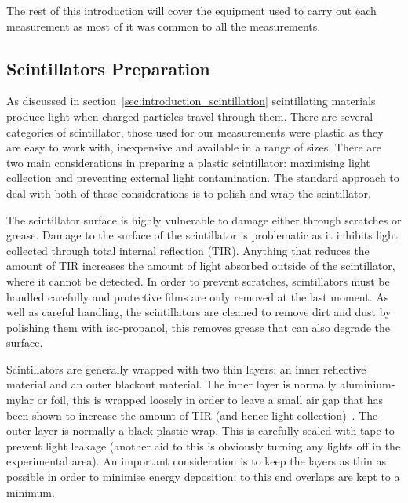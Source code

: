 The rest of this introduction will cover the equipment used to carry out each measurement as most of it was common to all the measurements.
\subsection{Scintillators Preparation} %
\label{sub:scintillator_preparation}
As discussed in section~\ref{sec:introduction_scintillation} scintillating materials produce light when charged particles travel through them. There are several categories of scintillator, those used for our measurements were plastic as they are easy to work with, inexpensive and available in a range of sizes. There are two main considerations in preparing a plastic scintillator: maximising light collection and preventing external light contamination. The standard approach to deal with both of these considerations is to polish and wrap the scintillator.

The scintillator surface is highly vulnerable to damage either through scratches or grease. Damage to the surface of the scintillator is problematic as it inhibits light collected through total internal reflection (TIR). Anything that reduces the amount of TIR increases the amount of light absorbed outside of the scintillator, where it cannot be detected. In order to prevent scratches, scintillators must be handled carefully and protective films are only removed at the last moment. As well as careful handling, the scintillators are cleaned to remove dirt and dust by polishing them with iso-propanol, this removes grease that can also degrade the surface.

Scintillators are generally wrapped with two thin layers: an inner reflective material and an outer blackout material. The inner layer is normally aluminium-mylar or foil, this is wrapped loosely in order to leave a small air gap that has been shown to increase the amount of TIR (and hence light collection)~\cite{air gap to increase light collection}. The outer layer is normally a black plastic wrap. This is carefully sealed with tape to prevent light leakage (another aid to this is obviously turning any lights off in the experimental area). An important consideration is to keep the layers as thin as possible in order to minimise energy deposition; to this end overlaps are kept to a minimum.

